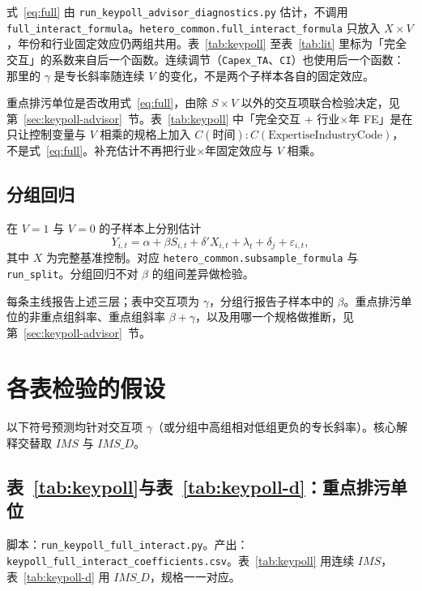\documentclass[11pt]{article}
\begin{document}
式~\eqref{eq:full} 由 \texttt{run\_keypoll\_advisor\_diagnostics.py} 估计，不调用 \texttt{full\_interact\_formula}。\texttt{hetero\_common.full\_interact\_formula} 只放入 \(X\times V\)，年份和行业固定效应仍两组共用。表~\ref{tab:keypoll} 至表~\ref{tab:lit} 里标为「完全交互」的系数来自后一个函数。连续调节（\texttt{Capex\_TA}、\texttt{CI}）也使用后一个函数：那里的 \(\gamma\) 是专长斜率随连续 \(V\) 的变化，不是两个子样本各自的固定效应。

重点排污单位是否改用式~\eqref{eq:full}，由除 \(S\times V\) 以外的交互项联合检验决定，见第~\ref{sec:keypoll-advisor}~节。表~\ref{tab:keypoll} 中「完全交互 + 行业\(\times\)年 FE」是在只让控制变量与 \(V\) 相乘的规格上加入 \(C(\text{时间}):C(\text{ExpertiseIndustryCode})\)，不是式~\eqref{eq:full}。补充估计不再把行业\(\times\)年固定效应与 \(V\) 相乘。

\subsection{分组回归}

在 \(V=1\) 与 \(V=0\) 的子样本上分别估计
\begin{equation}
Y_{i,t}=\alpha+\beta S_{i,t}+\delta'X_{i,t}+\lambda_t+\delta_j+\varepsilon_{i,t},
\label{eq:split}
\end{equation}
其中 \(X\) 为完整基准控制。对应 \texttt{hetero\_common.subsample\_formula} 与 \texttt{run\_split}。分组回归不对 \(\beta\) 的组间差异做检验。

每条主线报告上述三层；表中交互项为 \(\gamma\)，分组行报告子样本中的 \(\beta\)。重点排污单位的非重点组斜率、重点组斜率 \(\beta+\gamma\)，以及用哪一个规格做推断，见第~\ref{sec:keypoll-advisor}~节。

\section{各表检验的假设}
\label{sec:hypotheses}

以下符号预测均针对交互项 \(\gamma\)（或分组中高组相对低组更负的专长斜率）。核心解释交替取 \(IMS\) 与 \(IMS\_D\)。

\subsection{表~\ref{tab:keypoll}与表~\ref{tab:keypoll-d}：重点排污单位}

脚本：\texttt{run\_keypoll\_full\_interact.py}。产出：\texttt{keypoll\_full\_interact\_coefficients.csv}。表~\ref{tab:keypoll} 用连续 \(IMS\)，表~\ref{tab:keypoll-d} 用 \(IMS\_D\)，规格一一对应。
\end{document}
